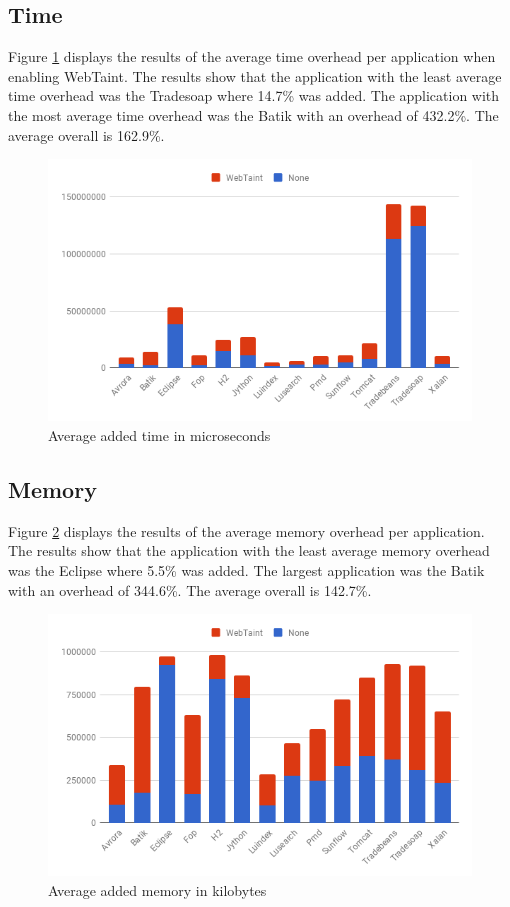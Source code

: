 \subsection{Time}
Figure \ref{fig:Time} displays the results of the average time overhead per application when enabling WebTaint. The results show that the application with the least average time overhead was the Tradesoap where 14.7\% was added. The application with the most average time overhead was the Batik with an overhead of 432.2\%. The average overall is 162.9\%.

\begin{figure}[H]
    \centering
    \includegraphics[width=\textwidth]{images/Time.png}
    \caption{Average added time in microseconds}
    \label{fig:Time}
\end{figure}



\subsection{Memory}
Figure \ref{fig:Memory} displays the results of the average memory overhead per application. The results show that the application with the least average memory overhead was the Eclipse where 5.5\% was added. The largest application was the Batik with an overhead of 344.6\%. The average overall is 142.7\%.

\begin{figure}[H]
    \centering
    \includegraphics[width=\textwidth]{images/Memory.png}
    \caption{Average added memory in kilobytes}
    \label{fig:Memory}
\end{figure}